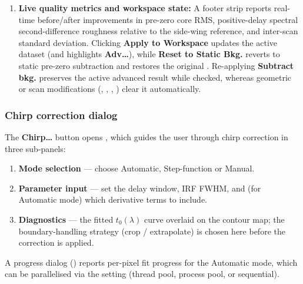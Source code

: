 \begin{enumerate}
\begin{itemize}
                configurable delays highlighting the scatter core regions.
          \item \emph{Kinetics:} Before-vs-after kinetic traces at the focused
                band's core and side wings (populated via \textbf{From Focused Band}).
          \item \emph{Scatter Diagnostics:} Pre-zero spectrum equipped with an
                interactive Matplotlib  (active when
                \textbf{Pick on Plot} is toggled), normalised scatter basis
                shapes compared against $P_0$, and the extracted delay-dependent
                amplitude envelope $a(\tau)$ / $a_{\mathrm{smooth}}(\tau)$ and
                centroid shift $\delta\lambda(\tau)$.
        \end{itemize}
  \item \textbf{Live quality metrics and workspace state:} A footer strip reports
        real-time before/after improvements in pre-zero core RMS, positive-delay
        spectral second-difference roughness relative to the side-wing reference,
        and inter-scan standard deviation. Clicking \textbf{Apply to Workspace}
        updates the active dataset (and highlights \textbf{Adv\ldots}), while
        \textbf{Reset to Static Bkg.} reverts to static pre-zero subtraction and
        restores the original . Re-applying \textbf{Subtract bkg.}
        preserves the active advanced result while checked, whereas geometric or
        scan modifications (, ,
        , ) clear it automatically.
\end{enumerate}

\subsubsection{Chirp correction dialog}

The \textbf{Chirp\ldots} button opens , which guides
the user through chirp correction in three sub-panels:
\begin{enumerate}
  \item \textbf{Mode selection} --- choose Automatic, Step-function or Manual.
  \item \textbf{Parameter input} --- set the delay window, IRF FWHM, and
        (for Automatic mode) which derivative terms to include.
  \item \textbf{Diagnostics} --- the fitted $t_0(\lambda)$ curve overlaid on
        the contour map; the boundary-handling strategy (crop / extrapolate)
        is chosen here before the correction is applied.
\end{enumerate}
A progress dialog () reports per-pixel fit
progress for the Automatic mode, which can be parallelised via the
 setting (thread pool, process pool, or sequential).

